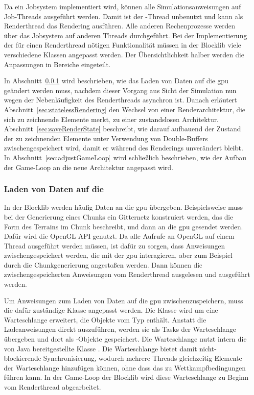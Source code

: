 Da ein Jobsystem implementiert wird, können alle Simulationsanweisungen auf Job-Threads ausgeführt werden. Damit ist der -Thread unbenutzt und kann als Renderthread das Rendering ausführen. Alle anderen Rechenprozesse werden über das Jobsystem auf anderen Threads durchgeführt. Bei der Implementierung der für einen Renderthread nötigen Funktionalität müssen in der Blocklib viele verschiedene Klassen angepasst werden. Der Übersichtlichkeit halber werden die Anpassungen in Bereiche eingeteilt. 

In Abschnitt~\ref{sec:loader} wird beschrieben, wie das Laden von Daten auf die \ac{gpu} geändert werden muss, nachdem dieser Vorgang aus Sicht der Simulation nun wegen der Nebenläufigkeit des Renderthreads asynchron ist. Danach erläutert Abschnitt~\ref{sec:statelessRendering} den Wechsel von einer Renderarchitektur, die sich zu zeichnende Elemente merkt, zu einer zustandslosen Architektur. Abschnitt~\ref{sec:saveRenderState} beschreibt, wie darauf aufbauend der Zustand der zu zeichnenden Elemente unter Verwendung von Double-Buffers zwischengespeichert wird, damit er während des Renderings unverändert bleibt. In Abschnitt~\ref{sec:adjustGameLoop} wird schließlich beschrieben, wie der Aufbau der Game-Loop an die neue Architektur angepasst wird.

\subsubsection{Laden von Daten auf die }\label{sec:loader}
In der Blocklib werden häufig Daten an die \ac{gpu} übergeben. Beispielsweise muss bei der Generierung eines Chunks ein Gitternetz konstruiert werden, das die Form des Terrains im Chunk beschreibt, und dann an die \ac{gpu} gesendet werden. Dafür wird die OpenGL API genutzt. Da alle Aufrufe an OpenGL auf einem Thread ausgeführt werden müssen, ist dafür zu sorgen, dass Anweisungen zwischengespeichert werden, die mit der \ac{gpu} interagieren, aber zum Beispiel durch die Chunkgenerierung angestoßen werden. Dann können die zwischengespeicherten Anweisungen vom Renderthread ausgelesen und ausgeführt werden. 

Um Anweisungen zum Laden von Daten auf die \ac{gpu} zwischenzuspeichern, muss die dafür zuständige Klasse  angepasst werden. Die Klasse wird um eine Warteschlange erweitert, die Objekte vom Typ  enthält. Anstatt die Ladeanweisungen direkt auszuführen, werden sie als Tasks der Warteschlange übergeben und dort als -Objekte gespeichert. Die Warteschlange nutzt intern die von Java bereitgestellte Klasse . Die Warteschlange bietet damit nicht-blockierende Synchronisierung, wodurch mehrere Threads gleichzeitig Elemente der Warteschlange hinzufügen können, ohne dass das zu Wettkampfbedingungen führen kann. In der Game-Loop der Blocklib wird diese Warteschlange zu Beginn vom Renderthread abgearbeitet.


